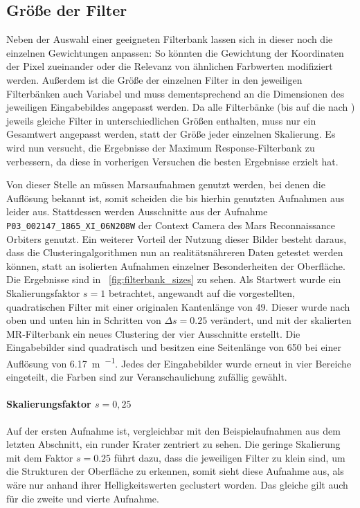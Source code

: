 \subsection{Größe der Filter}
\label{ssec:initialization_filtersize}

Neben der Auswahl einer geeigneten Filterbank lassen sich in dieser noch die einzelnen Gewichtungen anpassen: So könnten \zB die Gewichtung der Koordinaten der Pixel zueinander oder die Relevanz von ähnlichen Farbwerten modifiziert werden. Außerdem ist die Größe der einzelnen Filter in den jeweiligen Filterbänken auch Variabel und muss dementsprechend an die Dimensionen des jeweiligen Eingabebildes angepasst werden. Da alle Filterbänke (bis auf die nach \cite{jain_91}) jeweils gleiche Filter in unterschiedlichen Größen enthalten, muss nur ein Gesamtwert angepasst werden, statt der Größe jeder einzelnen Skalierung. Es wird nun versucht, die Ergebnisse der Maximum Response-Filterbank zu verbessern, da diese in vorherigen Versuchen die besten Ergebnisse erzielt hat.

Von dieser Stelle an müssen Marsaufnahmen genutzt werden, bei denen die Auflösung bekannt ist, somit scheiden die bis hierhin genutzten Aufnahmen aus \cite{greeley_13} leider aus. Stattdessen werden Ausschnitte aus der Aufnahme \texttt{P03\_002147\_1865\_XI\_06N208W} der Context Camera des Mars Reconnaissance Orbiters genutzt. Ein weiterer Vorteil der Nutzung dieser Bilder besteht daraus, dass die Clusteringalgorithmen nun an realitätsnähreren Daten getestet werden können, statt an isolierten Aufnahmen einzelner Besonderheiten der Oberfläche. Die Ergebnisse sind in \figurename~\ref{fig:filterbank_sizes} zu sehen. Als Startwert wurde ein Skalierungsfaktor $s=1$ betrachtet, angewandt auf die vorgestellten, quadratischen Filter mit einer originalen Kantenlänge von \SI{49}{\pixel}. Dieser wurde nach oben und unten hin in Schritten von $\Delta s=0.25$ verändert, und mit der skalierten MR-Filterbank ein neues Clustering der vier Ausschnitte erstellt. Die Eingabebilder sind quadratisch und besitzen eine Seitenlänge von \SI{650}{\pixel} bei einer Auflösung von \SI{6,17}{\meter\per\pixel}. Jedes der Eingabebilder wurde erneut in vier Bereiche eingeteilt, die Farben sind zur Veranschaulichung zufällig gewählt.

\paragraph{Skalierungsfaktor $s=0,25$}

Auf der ersten Aufnahme ist, vergleichbar mit den Beispielaufnahmen aus dem letzten Abschnitt, ein runder Krater zentriert zu sehen. Die geringe Skalierung mit dem Faktor $s=0.25$ führt dazu, dass die jeweiligen Filter zu klein sind, um die Strukturen der Oberfläche zu erkennen, somit sieht diese Aufnahme aus, als wäre nur anhand ihrer Helligkeitswerten geclustert worden. Das gleiche gilt auch für die zweite und vierte Aufnahme.

